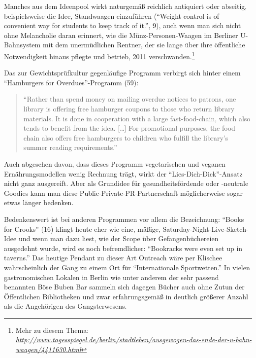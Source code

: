 \documentclass[a4paper,
fontsize=11pt,
oneside,
numbers=noperiodatend,
parskip=half-,
bibliography=totoc,
final
]{scrartcl}
\begin{document}
Manches aus dem Ideenpool wirkt naturgemäß reichlich antiquiert oder
abseitig, beispielsweise die Idee, Standwaagen einzuführen
(\enquote{Weight control is of convenient way for students to keep track
of it.}, 9), auch wenn man sich nicht ohne Melancholie daran erinnert,
wie die Münz-Personen-Waagen im Berliner U-Bahnsystem mit dem
unermüdlichen Rentner, der sie lange über ihre öffentliche Notwendigkeit
hinaus pflegte und betrieb, 2011 verschwanden.\footnote{Mehr zu diesem
  Thema:
  \href{http://www.tagesspiegel.de/berlin/stadtleben/ausgewogen-das-ende-der-u-bahn-waagen/4411630.html}{\emph{http://www.tagesspiegel.de/berlin/stadtleben/ausgewogen-das-ende-der-u-bahn-waagen/4411630.html}}}

Das zur Gewichtsprüfkultur gegenläufige Programm verbirgt sich hinter
einem \enquote{Hamburgers for Overdues}-Programm (59):

\begin{quote}
\enquote{Rather than spend money on mailing overdue notices to patrons,
one library is offering free hamburger coupons to those who return
library materials. It is done in cooperation with a large
fast-food-chain, which also tends to benefit from the idea.
{[}\ldots{}{]} For promotional purposes, the food chain also offers free
hamburgers to children who fulfill the library's summer reading
requirements.}
\end{quote}

Auch abgesehen davon, dass dieses Programm vegetarischen und veganen
Ernährungsmodellen wenig Rechnung trägt, wirkt der
\enquote{Lies-Dich-Dick}-Ansatz nicht ganz ausgereift. Aber als
Grundidee für gesundheitsfördende oder -neutrale Goodies kann man diese
Public-Private-PR-Partnerschaft möglicherweise sogar etwas länger
bedenken.

Bedenkenswert ist bei anderen Programmen vor allem die Bezeichnung:
\enquote{Books for Crooks} (16) klingt heute eher wie eine, mäßige,
Saturday-Night-Live-Sketch-Idee und wenn man dazu liest, wie der Scope
über Gefangenbüchereien ausgedehnt wurde, wird es noch befremdlicher:
\enquote{Bookracks were even set up in taverns.} Das heutige Pendant zu
dieser Art Outreach wäre per Klischee wahrscheinlich der Gang zu einem
Ort für \enquote{Internationale Sportwetten.} In vielen gastronomischen
Lokalen in Berlin wie unter anderem der sehr passend benannten Böse
Buben Bar sammeln sich dagegen Bücher auch ohne Zutun der Öffentlichen
Bibliotheken und zwar erfahrungsgemäß in deutlich größerer Anzahl als
die Angehörigen des Gangsterwesens.
\end{document}
